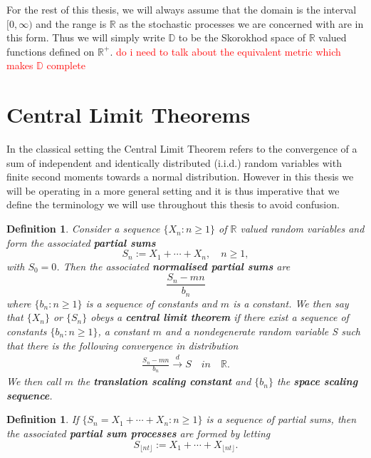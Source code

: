 \documentclass[honours,12pt]{UNSWthesis}
\newcommand{\R}{\mathbb{R}}
\newcommand{\Rp}{\mathbb R^+}
\newcommand{\1}{\mathbf 1}
\newcommand{\Floor}[1]{{\lfloor {#1} \rfloor}}
\newcommand{\cd}{\overset{d}{\longrightarrow}}
\newcommand{\D}{\mathbb{D}}
\newtheorem{definition}[theorem]{Definition}
\numberwithin{equation}{section}
\theoremstyle{definition}
\theoremstyle{remark}
\begin{document}
For the rest of this thesis, we will always assume that the domain is the interval
$[0,\infty)$ and the range is $\R$ as the stochastic processes we are concerned with are in this form. Thus we will simply write $\D$ to be the Skorokhod space of $\R$ valued functions defined on $\Rp$.
\textcolor{red}{do i need to talk about the equivalent metric which makes $\D$ complete}
\section{Central Limit Theorems}
In the classical setting the Central Limit Theorem refers to the convergence of a sum of independent and identically distributed (i.i.d.) random variables with finite second moments towards a normal distribution. However in this thesis we will be operating in a more general setting and it is thus imperative that we define the terminology we will use throughout this thesis to avoid confusion.\\

\begin{definition}
	Consider a sequence $\{X_n:n\geq1\}$ of $\R$ valued random variables and form the associated \textbf{partial sums}
	\[
		S_n:=X_1+\cdots+X_n,\quad n\geq1,
	\]
with $S_0=0$. Then the associated \textbf{normalised partial sums} are
\[
	\frac{S_n-mn}{b_n}
\]
where $\{b_n:n\geq 1\}$ is a sequence of constants and $m$ is a constant. We then say that $\{X_n\}$ or $\{S_n\}$ obeys a \textbf{central limit theorem} if there exist a sequence of constants $\{b_n:n\geq 1\}$, a constant $m$ and a nondegenerate random variable S such that there is the following convergence in distribution
\begin{align}\label{eq:partialSum}
	\frac{S_n-mn}{b_n}\cd S \quad in\quad \R.
\end{align}
We then call $m$ the \textbf{translation scaling constant} and $\{b_n\}$ the \textbf{space scaling sequence}.\\
\end{definition}



\begin{definition}
	If $\{S_n=X_1+\cdots+X_n:n\geq1\}$ is a sequence of partial sums, then the associated \textbf{partial sum processes} are formed by letting
	\[
		S_\Floor{nt}:=X_1+\cdots+X_\Floor{nt}.
	\]
\end{definition}
\end{document}
